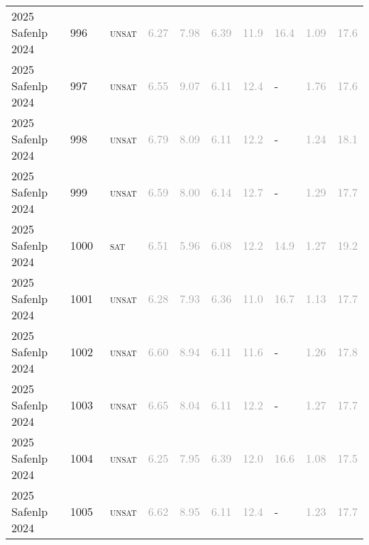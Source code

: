 \begin{center}
{\begin{longtable}{@{}llllllllll@{}}
2025 Safenlp 2024 & 996 & ~\textsc{unsat} & \textcolor{darkgray}{6.27} & \textcolor{darkgray}{7.98} & \textcolor{darkgray}{6.39} & \textcolor{darkgray}{11.9} & \textcolor{darkgray}{16.4} & \textcolor{darkgray}{1.09} & \textcolor{darkgray}{17.6} \\
2025 Safenlp 2024 & 997 & ~\textsc{unsat} & \textcolor{darkgray}{6.55} & \textcolor{darkgray}{9.07} & \textcolor{darkgray}{6.11} & \textcolor{darkgray}{12.4} & - & \textcolor{darkgray}{1.76} & \textcolor{darkgray}{17.6} \\
2025 Safenlp 2024 & 998 & ~\textsc{unsat} & \textcolor{darkgray}{6.79} & \textcolor{darkgray}{8.09} & \textcolor{darkgray}{6.11} & \textcolor{darkgray}{12.2} & - & \textcolor{darkgray}{1.24} & \textcolor{darkgray}{18.1} \\
2025 Safenlp 2024 & 999 & ~\textsc{unsat} & \textcolor{darkgray}{6.59} & \textcolor{darkgray}{8.00} & \textcolor{darkgray}{6.14} & \textcolor{darkgray}{12.7} & - & \textcolor{darkgray}{1.29} & \textcolor{darkgray}{17.7} \\
2025 Safenlp 2024 & 1000 & ~\textsc{sat} & \textcolor{darkgray}{6.51} & \textcolor{darkgray}{5.96} & \textcolor{darkgray}{6.08} & \textcolor{darkgray}{12.2} & \textcolor{darkgray}{14.9} & \textcolor{darkgray}{1.27} & \textcolor{darkgray}{19.2} \\
2025 Safenlp 2024 & 1001 & ~\textsc{unsat} & \textcolor{darkgray}{6.28} & \textcolor{darkgray}{7.93} & \textcolor{darkgray}{6.36} & \textcolor{darkgray}{11.0} & \textcolor{darkgray}{16.7} & \textcolor{darkgray}{1.13} & \textcolor{darkgray}{17.7} \\
2025 Safenlp 2024 & 1002 & ~\textsc{unsat} & \textcolor{darkgray}{6.60} & \textcolor{darkgray}{8.94} & \textcolor{darkgray}{6.11} & \textcolor{darkgray}{11.6} & - & \textcolor{darkgray}{1.26} & \textcolor{darkgray}{17.8} \\
2025 Safenlp 2024 & 1003 & ~\textsc{unsat} & \textcolor{darkgray}{6.65} & \textcolor{darkgray}{8.04} & \textcolor{darkgray}{6.11} & \textcolor{darkgray}{12.2} & - & \textcolor{darkgray}{1.27} & \textcolor{darkgray}{17.7} \\
2025 Safenlp 2024 & 1004 & ~\textsc{unsat} & \textcolor{darkgray}{6.25} & \textcolor{darkgray}{7.95} & \textcolor{darkgray}{6.39} & \textcolor{darkgray}{12.0} & \textcolor{darkgray}{16.6} & \textcolor{darkgray}{1.08} & \textcolor{darkgray}{17.5} \\
2025 Safenlp 2024 & 1005 & ~\textsc{unsat} & \textcolor{darkgray}{6.62} & \textcolor{darkgray}{8.95} & \textcolor{darkgray}{6.11} & \textcolor{darkgray}{12.4} & - & \textcolor{darkgray}{1.23} & \textcolor{darkgray}{17.7} \\

\end{longtable}}
\end{center}
